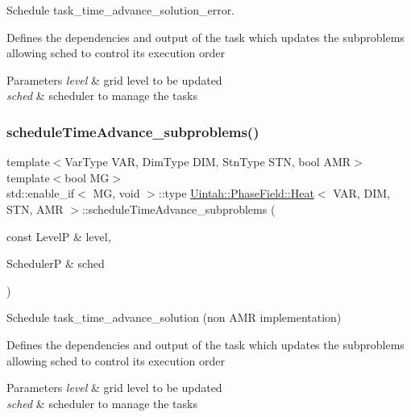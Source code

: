Schedule task\+\_\+time\+\_\+advance\+\_\+solution\+\_\+error. 

Defines the dependencies and output of the task which updates the subproblems allowing sched to control its execution order


\begin{DoxyParams}{Parameters}
{\em level} & grid level to be updated \\
\hline
{\em sched} & scheduler to manage the tasks \\
\hline
\end{DoxyParams}
\mbox{\label{classUintah_1_1PhaseField_1_1Heat_a7daf1da9106d539e50121297c5ecf0b3}} 
\subsubsection{\texorpdfstring{schedule\+Time\+Advance\+\_\+subproblems()}{scheduleTimeAdvance\_subproblems()}\hspace{0.1cm}{\footnotesize\ttfamily [1/2]}}
{\footnotesize\ttfamily template$<$Var\+Type V\+AR, Dim\+Type D\+IM, Stn\+Type S\+TN, bool A\+MR$>$ \\
template$<$bool MG$>$ \\
std\+::enable\+\_\+if$<$ MG, void $>$\+::type \hyperlink{classUintah_1_1PhaseField_1_1Heat}{Uintah\+::\+Phase\+Field\+::\+Heat}$<$ V\+AR, D\+IM, S\+TN, A\+MR $>$\+::schedule\+Time\+Advance\+\_\+subproblems (\begin{DoxyParamCaption}\item[{const LevelP \&}]{level,  }\item[{SchedulerP \&}]{sched }\end{DoxyParamCaption})\hspace{0.3cm}{\ttfamily [protected]}}



Schedule task\+\_\+time\+\_\+advance\+\_\+solution (non A\+MR implementation) 

Defines the dependencies and output of the task which updates the subproblems allowing sched to control its execution order


\begin{DoxyParams}{Parameters}
{\em level} & grid level to be updated \\
\hline
{\em sched} & scheduler to manage the tasks \\
\hline
\end{DoxyParams}
\mbox{\label{classUintah_1_1PhaseField_1_1Heat_a7daf1da9106d539e50121297c5ecf0b3}} 
